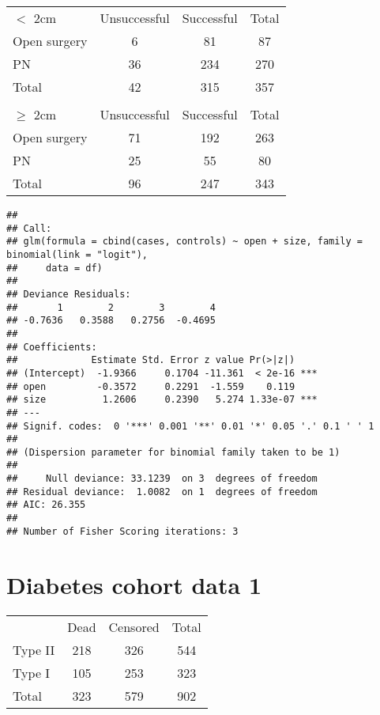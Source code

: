 \documentclass[landscape,twocolumn,letterpaper,9pt,reqno]{article}\usepackage[]{graphicx}\usepackage[]{color}
\newenvironment{knitrout}{}{} %
\begin{document}
\begin{table}[h]
	\centering
	\begin{tabular}{lcc|c}
		$<$ 2cm & Unsuccessful &  Successful & Total\\
		Open surgery & 6 & 81 & 87 \\
		PN 			 & 36 & 234 & 270 \\
		\hline
		Total 	& 42 & 315 & 357 \\
		& & &  \\
				$\geq$ 2cm & Unsuccessful &  Successful & Total\\
		Open surgery & 71 & 192 & 263 \\
		PN 			 & 25 & 55 & 80 \\
		\hline
		Total 		& 96 & 247 & 343
	\end{tabular}
\end{table}


\begin{knitrout}
\color{fgcolor}
\begin{verbatim}
## 
## Call:
## glm(formula = cbind(cases, controls) ~ open + size, family = binomial(link = "logit"), 
##     data = df)
## 
## Deviance Residuals: 
##       1        2        3        4  
## -0.7636   0.3588   0.2756  -0.4695  
## 
## Coefficients:
##             Estimate Std. Error z value Pr(>|z|)    
## (Intercept)  -1.9366     0.1704 -11.361  < 2e-16 ***
## open         -0.3572     0.2291  -1.559    0.119    
## size          1.2606     0.2390   5.274 1.33e-07 ***
## ---
## Signif. codes:  0 '***' 0.001 '**' 0.01 '*' 0.05 '.' 0.1 ' ' 1
## 
## (Dispersion parameter for binomial family taken to be 1)
## 
##     Null deviance: 33.1239  on 3  degrees of freedom
## Residual deviance:  1.0082  on 1  degrees of freedom
## AIC: 26.355
## 
## Number of Fisher Scoring iterations: 3
\end{verbatim}

\end{knitrout}

\clearpage

\section{Diabetes cohort data 1}

\begin{table}[h]
	\centering
	\begin{tabular}{lcc|c}
		& Dead &  Censored & Total\\
		Type II & 218 & 326 & 544 \\
		Type I & 105 & 253 & 323 \\
		\hline
		Total & 323 & 579 & 902
	\end{tabular}
\end{table}
\end{document}
